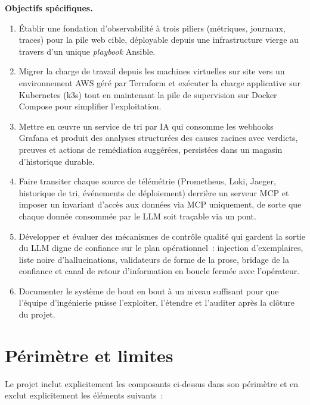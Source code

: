\documentclass[11pt,a4paper,oneside]{report}
\begin{document}
\textbf{Objectifs spécifiques.}
\begin{enumerate}
  \item Établir une fondation d'observabilité à trois piliers
        (métriques, journaux, traces) pour la pile web cible,
        déployable depuis une infrastructure vierge au travers d'un
        unique \emph{playbook} Ansible.
  \item Migrer la charge de travail depuis les machines virtuelles
        sur site vers un environnement AWS géré par Terraform et
        exécuter la charge applicative sur Kubernetes (k3s) tout en
        maintenant la pile de supervision sur Docker Compose pour
        simplifier l'exploitation.
  \item Mettre en \oe{}uvre un service de tri par IA qui consomme
        les webhooks Grafana et produit des analyses structurées des
        causes racines avec verdicts, preuves et actions de
        remédiation suggérées, persistées dans un magasin
        d'historique durable.
  \item Faire transiter chaque source de télémétrie (Prometheus,
        Loki, Jaeger, historique de tri, événements de déploiement)
        derrière un serveur MCP et imposer un invariant d'accès aux
        données via MCP uniquement, de sorte que chaque donnée
        consommée par le LLM soit traçable via un pont.
  \item Développer et évaluer des mécanismes de contrôle qualité qui
        gardent la sortie du LLM digne de confiance sur le plan
        opérationnel~: injection d'exemplaires, liste noire
        d'hallucinations, validateurs de forme de la prose, bridage
        de la confiance et canal de retour d'information en boucle
        fermée avec l'opérateur.
  \item Documenter le système de bout en bout à un niveau suffisant
        pour que l'équipe d'ingénierie puisse l'exploiter, l'étendre
        et l'auditer après la clôture du projet.
\end{enumerate}

\section{Périmètre et limites}

Le projet inclut explicitement les composants ci-dessus dans son
périmètre et en exclut explicitement les éléments suivants~:
\end{document}
